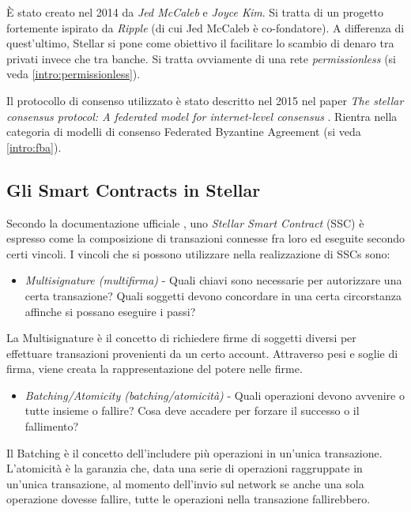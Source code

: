 È stato creato nel 2014 da \textit{Jed McCaleb} e \textit{Joyce Kim}.
Si tratta di un progetto fortemente ispirato da \textit{Ripple} (di cui Jed McCaleb
è co-fondatore). A differenza di quest'ultimo, Stellar si pone come obiettivo
il facilitare lo scambio di denaro tra privati invece che tra banche. Si tratta ovviamente di
una rete \textit{permissionless} (si veda \ref{intro:permissionless}).

Il protocollo di consenso utilizzato è stato descritto nel 2015 nel paper
\textit{The stellar consensus protocol: A federated model for internet-level consensus} \cite{mazieres2015stellar}.
Rientra nella categoria di modelli di consenso Federated Byzantine Agreement (si veda \ref{intro:fba}).


\subsection{Gli Smart Contracts in Stellar}
\label{subsec:stellar smart contracts}

Secondo la documentazione ufficiale \cite{stellar-doc-sc},
uno \textit{Stellar Smart Contract} (SSC) è espresso come la composizione
di transazioni connesse fra loro ed eseguite secondo certi vincoli.
I vincoli che si possono utilizzare nella realizzazione di SSCs sono:

\begin{itemize}
	\item \textit{Multisignature (multifirma)} - Quali chiavi sono necessarie
	      per autorizzare
	      una certa transazione? Quali soggetti devono concordare in una certa
	      circorstanza affinche si possano eseguire i passi?
\end{itemize}
La Multisignature è il concetto di richiedere firme di soggetti diversi per
effettuare transazioni provenienti da un certo account.
Attraverso pesi e soglie di firma,
viene creata la rappresentazione del potere nelle firme.

\begin{itemize}
	\item \textit{Batching/Atomicity (batching/atomicità)} -
	      Quali operazioni devono avvenire
	      o tutte insieme o fallire?
	      Cosa deve accadere per forzare il successo o il fallimento?
\end{itemize}
Il Batching è il concetto dell'includere più operazioni in un'unica transazione.
L'atomicità è la garanzia che, data una serie di operazioni raggruppate in
un'unica transazione,
al momento dell'invio sul network se anche una sola operazione dovesse fallire,
tutte le operazioni nella transazione fallirebbero.

